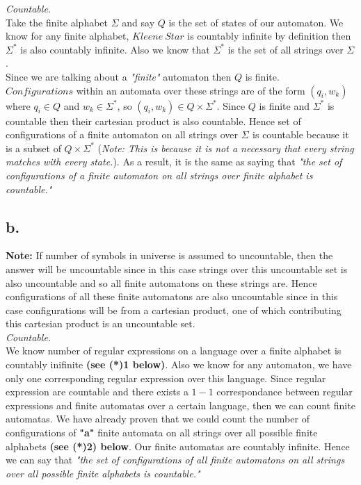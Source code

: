\documentclass[12pt]{article}
\begin{document}
\textit{Countable.}\\

Take the finite alphabet $\Sigma$ and say $Q$ is the set of states of our automaton. We know for any finite alphabet, $Kleene\ Star$ is countably infinite by definition then $\Sigma^*$ is also countably infinite. Also we know that $\Sigma^*$ is the set of all strings over $\Sigma$.\\

Since we are talking about a \textit{"finite"} automaton then $Q$ is finite.\\

$Configurations$ within an automata over these strings are of the form $(q_i, w_k)$ where $q_i\in Q$ and $w_k\in \Sigma_{}^*$, so $(q_i, w_k) \in Q \times \Sigma_{}^*$. Since $Q$ is finite and $\Sigma_{}^*$ is countable then their cartesian product is also countable. Hence set of configurations of a finite automaton on all strings over $\Sigma_{}$ is countable because it is a subset of $Q \times \Sigma_{}^*$ (\textit{Note: This is because it is not a necessary that every string matches with every state.}). As a result, it is the same as saying that \textit{"the set of configurations of a finite automaton on all strings over finite alphabet is countable."}

\subsection*{b.}

\textbf{Note: }If number of symbols in universe is assumed to uncountable, then the answer will be uncountable since in this case strings over this uncountable set is also uncountable and so all finite automatons on these strings are. Hence configurations of all these finite automatons are also uncountable since in this case configurations will be from a cartesian product, one of which contributing this cartesian product is an uncountable set.\\

\textit{Countable.}\\

We know number of regular expressions on a language over a finite alphabet is countably inifinite \textbf{(see (*)1 below)}. Also we know for any automaton, we have only one corresponding regular expression over this language. Since regular expression are countable and there exists a $1-1$ correspondance between regular expressions and finite automatas over a certain language, then we can count finite automatas. We have already proven that we could count the number of configurations of \textbf{"a"} finite automata on all strings over all possible finite alphabets \textbf{(see (*)2) below}. Our finite automatas are countably infinite. Hence we can say that \textit{"the set of configurations of all finite automatons on all strings over all possible finite alphabets is countable."}\\
\end{document}

